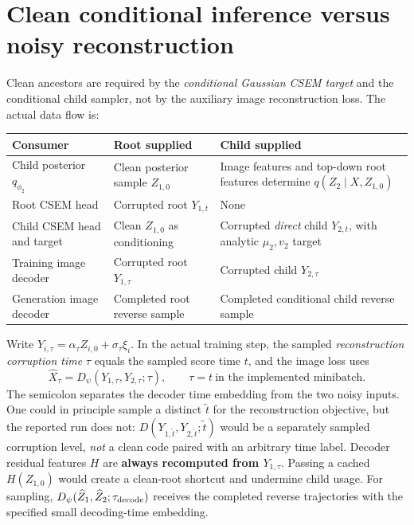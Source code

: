 \documentclass[10pt]{article}
\begin{document}
\section{Clean conditional inference versus noisy reconstruction}
Clean ancestors are required by the \emph{conditional Gaussian CSEM target} and the conditional child sampler, not by the auxiliary image reconstruction loss. The actual data flow is:
\begin{center}
\begin{tabularx}{\linewidth}{@{}lXX@{}}
\toprule
Consumer & Root supplied & Child supplied\\
\midrule
Child posterior $q_{\phi_2}$ & Clean posterior sample $Z_{1,0}$ & Image features and top-down root features determine $q(Z_2\mid X,Z_{1,0})$\\
Root CSEM head & Corrupted root $Y_{1,t}$ & None\\
Child CSEM head and target & Clean $Z_{1,0}$ as conditioning & Corrupted \emph{direct} child $Y_{2,t}$, with analytic $\mu_2,v_2$ target\\
Training image decoder & Corrupted root $Y_{1,\tau}$ & Corrupted child $Y_{2,\tau}$\\
Generation image decoder & Completed root reverse sample & Completed conditional child reverse sample\\
\bottomrule
\end{tabularx}
\end{center}
Write $Y_{i,\tau}=\alpha_\tau Z_{i,0}+\sigma_\tau\xi_i$. In the actual training step, the sampled \emph{reconstruction corruption time} $\tau$ equals the sampled score time $t$, and the image loss uses
\begin{equation}
\widehat X_\tau=D_\psi(Y_{1,\tau},Y_{2,\tau};\tau),\qquad \tau=t\ \text{in the implemented minibatch}.
\label{eq:recontime}
\end{equation}
The semicolon separates the decoder time embedding from the two noisy inputs. One could in principle sample a distinct $\widetilde t$ for the reconstruction objective, but the reported run does not: $D(Y_{1,\widetilde t},Y_{2,\widetilde t};\widetilde t)$ would be a separately sampled corruption level, \emph{not} a clean code paired with an arbitrary time label. Decoder residual features $H$ are \textbf{always recomputed from $Y_{1,\tau}$}. Passing a cached $H(Z_{1,0})$ would create a clean-root shortcut and undermine child usage. For sampling, $D_\psi(\widehat Z_1,\widehat Z_2;\tau_{\rm decode})$ receives the completed reverse trajectories with the specified small decoding-time embedding.
\end{document}
